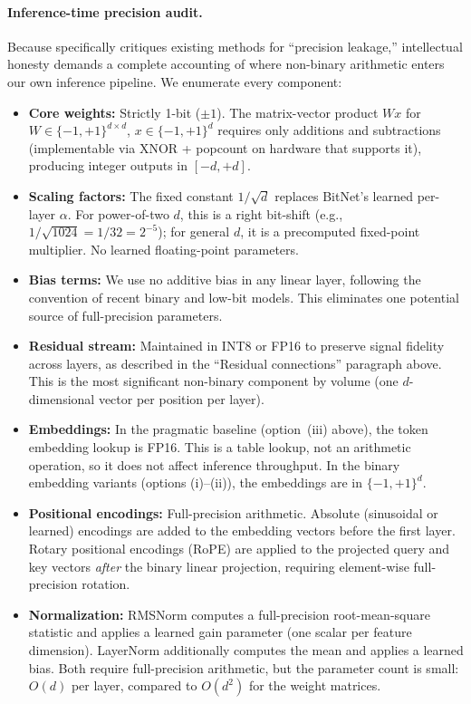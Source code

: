 \documentclass[12pt,a4paper]{article}
\theoremstyle{plain}
\theoremstyle{definition}
\theoremstyle{remark}
\newcommand{\pmone}{\{-1,+1\}}
\begin{document}
\paragraph{Inference-time precision audit.}
Because  specifically critiques existing methods for ``precision leakage,'' intellectual honesty demands a complete accounting of where non-binary arithmetic enters our own inference pipeline. We enumerate every component:
\begin{itemize}
    \item \textbf{Core weights:} Strictly 1-bit ($\pm 1$). The matrix-vector product $Wx$ for $W \in \pmone^{d \times d}$, $x \in \pmone^d$ requires only additions and subtractions (implementable via XNOR + popcount on hardware that supports it), producing integer outputs in $[-d, +d]$.
    \item \textbf{Scaling factors:} The fixed constant $1/\sqrt{d}$ replaces BitNet's learned per-layer $\alpha$. For power-of-two $d$, this is a right bit-shift (e.g., $1/\sqrt{1024} = 1/32 = 2^{-5}$); for general $d$, it is a precomputed fixed-point multiplier. No learned floating-point parameters.
    \item \textbf{Bias terms:} We use no additive bias in any linear layer, following the convention of recent binary and low-bit models. This eliminates one potential source of full-precision parameters.
    \item \textbf{Residual stream:} Maintained in INT8 or FP16 to preserve signal fidelity across layers, as described in the ``Residual connections'' paragraph above. This is the most significant non-binary component by volume (one $d$-dimensional vector per position per layer).
    \item \textbf{Embeddings:} In the pragmatic baseline (option~(iii) above), the token embedding lookup is FP16. This is a table lookup, not an arithmetic operation, so it does not affect inference throughput. In the binary embedding variants (options (i)--(ii)), the embeddings are in $\pmone^d$.
    \item \textbf{Positional encodings:} Full-precision arithmetic. Absolute (sinusoidal or learned) encodings are added to the embedding vectors before the first layer. Rotary positional encodings (RoPE) are applied to the projected query and key vectors \emph{after} the binary linear projection, requiring element-wise full-precision rotation.
    \item \textbf{Normalization:} RMSNorm computes a full-precision root-mean-square statistic and applies a learned gain parameter (one scalar per feature dimension). LayerNorm additionally computes the mean and applies a learned bias. Both require full-precision arithmetic, but the parameter count is small: $O(d)$ per layer, compared to $O(d^2)$ for the weight matrices.

\end{itemize}
\end{document}
